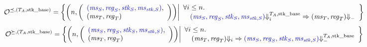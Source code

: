\documentclass[a4paper]{article}
\begin{document}
\[
  \lrol = \left\{ \npair{\left(\array{l}\src{(\ms_S,\reg_S,\stk_S,\ms_{\stk,S})},\\(\ms_T,\reg_T)\endarray\right)} \middle|
    \begin{array}{l}
      \forall i \leq n \ldotp \\
      \quad \src{(\ms_S,\reg_S,\stk_S,\ms_{\stk,S})} \sterm[i]{\ta,\stkb} \Rightarrow (\ms_T,\reg_T) \term\\
    \end{array}
\right\}
\]
\[
  \lror = \left\{ \npair{\left(\array{l}\src{(\ms_S,\reg_S,\stk_S,\ms_{\stk,S})},\\(\ms_T,\reg_T)\endarray\right)} \middle|
    \begin{array}{l}
      \forall i \leq n \ldotp \\ 
      \quad (\ms_T ,\reg_T) \term[i] \Rightarrow \src{(\ms_S,\reg_S,\stk_S,\ms_{\stk,S})} \sterm{\ta,\stkb}
    \end{array}
\right\}
\]


\end{document}
